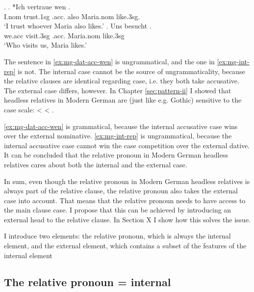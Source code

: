 \ex.\label{ex:mg-internal}
\ag. *Ich vertraue wen   . \\
I.\ac{nom} trust.1\ac{sg}\scsub{[dat]} .\ac{acc}. also Maria.\ac{nom} like.3\ac{sg}\scsub{[acc]}.\\
`I trust whoever Maria also likes.' \label{ex:mg-dat-acc-wen}
\bg. Uns besucht   .\\
 we.\ac{acc} visit.3\ac{sg}\scsub{[nom]} .\ac{acc}. Maria.\ac{nom} like.3\ac{sg}\scsub{[acc]}\\
 `Who visits us, Maria likes.' \label{ex:mg-int-rep}

The sentence in \ref{ex:mg-dat-acc-wen} is ungrammatical, and the one in \ref{ex:mg-int-rep} is not. The internal case cannot be the source of ungrammaticality, because the relative clauses are identical regarding case, i.e. they both take accusative. The external case differs, however. In Chapter \ref{sec:pattern-ii} I showed that headless relatives in Modern German are (just like e.g. Gothic) sensitive to the case scale:  <  < .

\ref{ex:mg-dat-acc-wen} is grammatical, because the internal accusative case wins over the external nominative. \ref{ex:mg-int-rep} is ungrammatical, because the internal accusative case cannot win the case competition over the external dative. It can be concluded that the relative pronoun in Modern German headless relatives cares about both the internal and the external case.

In sum, even though the relative pronoun in Modern German headless relatives is always part of the relative clause, the relative pronoun also takes the external case into account. That means that the relative pronoun needs to have access to the main clause case. I propose that this can be achieved by introducing an external head to the relative clause. In Section X I show how this solves the issue.

I introduce two elements: the relative pronoun, which is always the internal element, and the external element, which contains a subset of the features of the internal element



\subsection{The relative pronoun = internal}\label{sec:internal-element}


